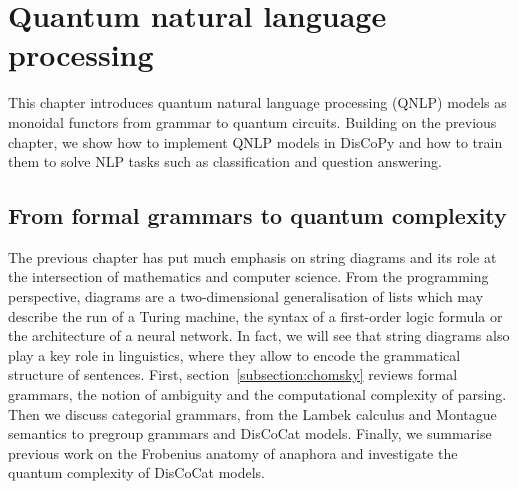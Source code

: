 
\chapter{Quantum natural language processing} \label{chapter-2:qnlp}

This chapter introduces quantum natural language processing (QNLP) models as monoidal functors from grammar to quantum circuits.
Building on the previous chapter, we show how to implement QNLP models in DisCoPy and how to train them to solve NLP tasks such as classification and question answering.

\section{From formal grammars to quantum complexity}\label{section:NLP}

The previous chapter has put much emphasis on string diagrams and its role at the intersection of mathematics and computer science.
From the programming perspective, diagrams are a two-dimensional generalisation of lists which may describe the run of a Turing machine, the syntax of a first-order logic formula or the architecture of a neural network.
In fact, we will see that string diagrams also play a key role in linguistics, where they allow to encode the grammatical structure of sentences.
First, section~\ref{subsection:chomsky} reviews formal grammars, the notion of ambiguity and the computational complexity of parsing.
Then we discuss categorial grammars, from the Lambek calculus and Montague semantics to pregroup grammars and DisCoCat models.
Finally, we summarise previous work on the Frobenius anatomy of anaphora and investigate the quantum complexity of DisCoCat models.
